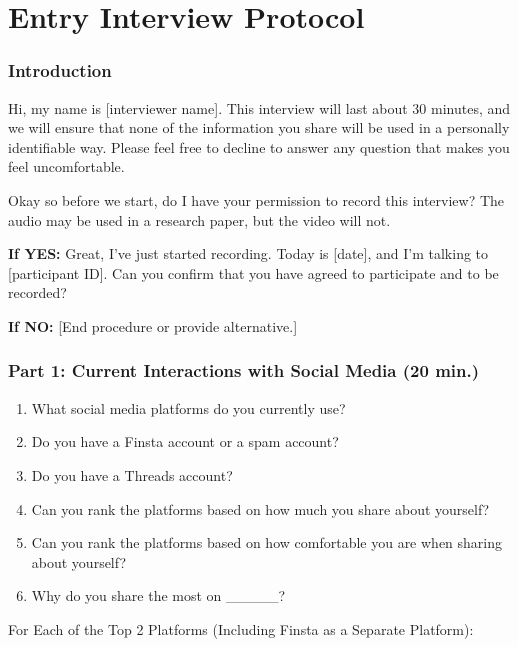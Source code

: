 \section{Entry Interview Protocol}
\label{ref:entry-protocol}

\subsubsection*{Introduction}
Hi, my name is [interviewer name]. This interview will last about 30 minutes, and we will ensure that none of the information you share will be used in a personally identifiable way. Please feel free to decline to answer any question that makes you feel uncomfortable.

\vspace{2mm}
\noindent Okay so before we start, do I have your permission to record this interview? The audio may be used in a research paper, but the video will not.

\textbf{If YES:}  
Great, I’ve just started recording. Today is [date], and I’m talking to [participant ID]. Can you confirm that you have agreed to participate and to be recorded?

\textbf{If NO:}  
[End procedure or provide alternative.]

\subsubsection*{Part 1: Current Interactions with Social Media (20 min.)}

\begin{enumerate}
    \item What social media platforms do you currently use?
    \item Do you have a Finsta account or a spam account?
    \item Do you have a Threads account?
    \item Can you rank the platforms based on how much you share about yourself?
    \item Can you rank the platforms based on how comfortable you are when sharing about yourself?
    \item Why do you share the most on \_\_\_\_\_?
\end{enumerate}

\noindent{}For Each of the Top 2 Platforms (Including Finsta as a Separate Platform):

